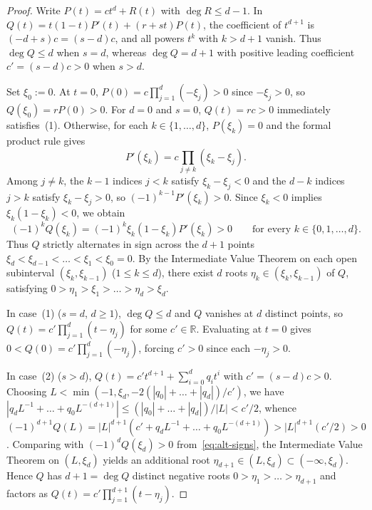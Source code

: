 \documentclass[11pt]{article}
\theoremstyle{definition}
\newcommand{\RR}{\mathbb{R}}
\begin{document}
\begin{proof}
Write $P(t) = c t^d + R(t)$ with $\deg R \le d-1$. In
$Q(t) = t(1-t)P'(t) + (r+st)P(t)$, the coefficient of $t^{d+1}$ is $(-d + s)c = (s-d)c$, and
all powers $t^k$ with $k > d+1$ vanish. Thus $\deg Q \le d$ when $s=d$, whereas $\deg Q = d+1$
with positive leading coefficient $c' = (s-d)c > 0$ when $s > d$.

Set $\xi_0 := 0$. At $t = 0$, $P(0) = c\prod_{j=1}^d (-\xi_j) > 0$ since $-\xi_j > 0$, so
$Q(\xi_0) = r P(0) > 0$. For $d=0$ and $s=0$, $Q(t) = rc > 0$ immediately satisfies~(1).
Otherwise, for each $k \in \{1,\dots,d\}$, $P(\xi_k) = 0$ and the formal product rule gives
\[
  P'(\xi_k) = c \prod_{j \neq k} (\xi_k - \xi_j).
\]
Among $j \neq k$, the $k-1$ indices $j < k$ satisfy $\xi_k - \xi_j < 0$ and the $d-k$ indices
$j > k$ satisfy $\xi_k - \xi_j > 0$, so $(-1)^{k-1} P'(\xi_k) > 0$. Since $\xi_k < 0$ implies
$\xi_k(1-\xi_k) < 0$, we obtain
\begin{equation}\label{eq:alt-signs}
  (-1)^k Q(\xi_k) = (-1)^k \xi_k(1-\xi_k) P'(\xi_k) > 0
  \qquad \text{for every } k \in \{0, 1, \dots, d\}.
\end{equation}
Thus $Q$ strictly alternates in sign across the $d+1$ points
$\xi_d < \xi_{d-1} < \dots < \xi_1 < \xi_0 = 0$. By the Intermediate Value Theorem on each
open subinterval $(\xi_k, \xi_{k-1})$ ($1 \le k \le d$), there exist $d$ roots $\eta_k \in
(\xi_k, \xi_{k-1})$ of $Q$, satisfying $0 > \eta_1 > \xi_1 > \dots > \eta_d > \xi_d$.

In case~(1) ($s = d$, $d \ge 1$), $\deg Q \le d$ and $Q$ vanishes at $d$ distinct points, so
$Q(t) = c' \prod_{j=1}^d (t - \eta_j)$ for some $c' \in \RR$. Evaluating at $t = 0$ gives
$0 < Q(0) = c' \prod_{j=1}^d (-\eta_j)$, forcing $c' > 0$ since each $-\eta_j > 0$.

In case~(2) ($s > d$), $Q(t) = c' t^{d+1} + \sum_{i=0}^d q_i t^i$ with $c' = (s-d)c > 0$.
Choosing $L < \min(-1, \xi_d, -2(|q_0|+\dots+|q_d|)/c')$, we have
$|q_d L^{-1} + \dots + q_0 L^{-(d+1)}| \le (|q_0|+\dots+|q_d|)/|L| < c'/2$, whence
$(-1)^{d+1} Q(L) = |L|^{d+1}(c' + q_d L^{-1} + \dots + q_0 L^{-(d+1)}) > |L|^{d+1}(c'/2) > 0$.
Comparing with $(-1)^d Q(\xi_d) > 0$ from~\eqref{eq:alt-signs}, the Intermediate Value
Theorem on $(L, \xi_d)$ yields an additional root $\eta_{d+1} \in (L, \xi_d) \subset
(-\infty, \xi_d)$. Hence $Q$ has $d+1 = \deg Q$ distinct negative roots
$0 > \eta_1 > \dots > \eta_{d+1}$ and factors as $Q(t) = c'\prod_{j=1}^{d+1}(t-\eta_j)$.
\end{proof}
\end{document}
